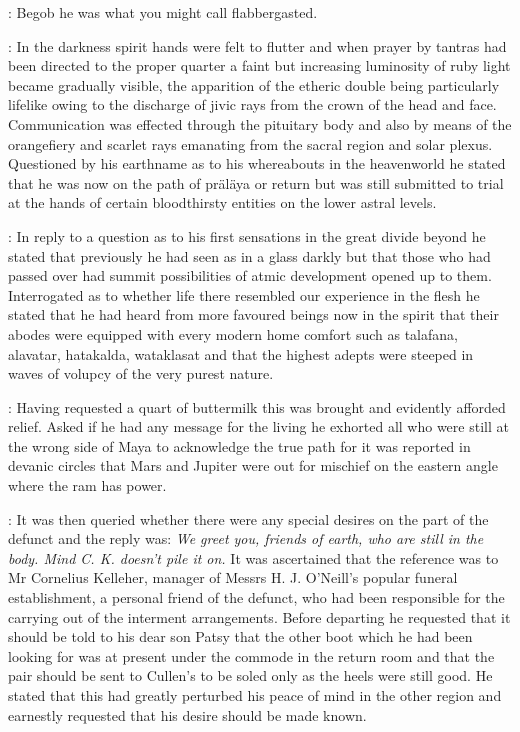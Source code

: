 \Nq:
Begob he was what you might call flabbergasted.

:
In the darkness spirit hands were felt to flutter and when prayer by
tantras had been directed to the proper quarter a faint but increasing
luminosity of ruby light became gradually visible, the apparition of the
etheric double being particularly lifelike owing to the discharge of jivic
rays from the crown of the head and face. Communication was effected
through the pituitary body and also by means of the orangefiery and
scarlet rays emanating from the sacral region and solar plexus. Questioned
by his earthname as to his whereabouts in the heavenworld he stated that
he was now on the path of präläya or return but was still submitted to
trial at the hands of certain bloodthirsty entities on the lower astral
levels.

:
In reply to a question as to his first sensations in the great
divide beyond he stated that previously he had seen as in a glass darkly
but that those who had passed over had summit possibilities of atmic
development opened up to them. Interrogated as to whether life there
resembled our experience in the flesh he stated that he had heard from
more favoured beings now in the spirit that their abodes were equipped
with every modern home comfort such as talafana, alavatar, hatakalda,
wataklasat and that the highest adepts were steeped in waves of volupcy
of the very purest nature.

:
Having requested a quart of buttermilk this was
brought and evidently afforded relief. Asked if he had any message
for the living he exhorted all who were still at the wrong side of Maya
to acknowledge the true path for it was reported in devanic circles that
Mars and Jupiter were out for mischief on the eastern angle where the
ram has power.

:
It was then queried whether there were any special
desires on the part of the defunct and the reply was: \emph{We greet you,
friends of earth, who are still in the body. Mind C. K. doesn't pile it
on.} It was ascertained that the reference was to Mr Cornelius Kelleher,
manager of Messrs H. J. O'Neill's popular funeral establishment, a
personal friend of the defunct, who had been responsible for the carrying
out of the interment arrangements. Before departing he requested that it
should be told to his dear son Patsy that the other boot which he had been
looking for was at present under the commode in the return room and that
the pair should be sent to Cullen's to be soled only as the heels were
still good. He stated that this had greatly perturbed his peace of mind in
the other region and earnestly requested that his desire should be made
known.

